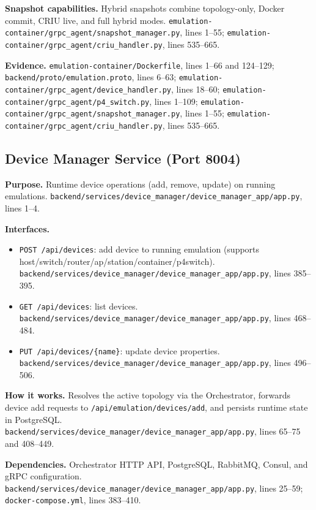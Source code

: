 \documentclass[conference]{IEEEtran}
\begin{document}
\textbf{Snapshot capabilities.} Hybrid snapshots combine topology-only, Docker commit, CRIU live, and full hybrid modes. \texttt{emulation-container/grpc\_agent/snapshot\_manager.py}, lines 1--55; \texttt{emulation-container/grpc\_agent/criu\_handler.py}, lines 535--665.

\textbf{Evidence.} \texttt{emulation-container/Dockerfile}, lines 1--66 and 124--129; \texttt{backend/proto/emulation.proto}, lines 6--63; \texttt{emulation-container/grpc\_agent/device\_handler.py}, lines 18--60; \texttt{emulation-container/grpc\_agent/p4\_switch.py}, lines 1--109; \texttt{emulation-container/grpc\_agent/snapshot\_manager.py}, lines 1--55; \texttt{emulation-container/grpc\_agent/criu\_handler.py}, lines 535--665.

\subsection{Device Manager Service (Port 8004)}
\textbf{Purpose.} Runtime device operations (add, remove, update) on running emulations. \texttt{backend/services/device\_manager/device\_manager\_app/app.py}, lines 1--4.

\textbf{Interfaces.}
\begin{itemize}
\item \texttt{POST /api/devices}: add device to running emulation (supports host/switch/router/ap/station/container/p4switch). \texttt{backend/services/device\_manager/device\_manager\_app/app.py}, lines 385--395.
\item \texttt{GET /api/devices}: list devices. \texttt{backend/services/device\_manager/device\_manager\_app/app.py}, lines 468--484.
\item \texttt{PUT /api/devices/\{name\}}: update device properties. \texttt{backend/services/device\_manager/device\_manager\_app/app.py}, lines 496--506.
\end{itemize}

\textbf{How it works.} Resolves the active topology via the Orchestrator, forwards device add requests to \texttt{/api/emulation/devices/add}, and persists runtime state in PostgreSQL. \texttt{backend/services/device\_manager/device\_manager\_app/app.py}, lines 65--75 and 408--449.

\textbf{Dependencies.} Orchestrator HTTP API, PostgreSQL, RabbitMQ, Consul, and gRPC configuration. \texttt{backend/services/device\_manager/device\_manager\_app/app.py}, lines 25--59; \texttt{docker-compose.yml}, lines 383--410.
\end{document}
